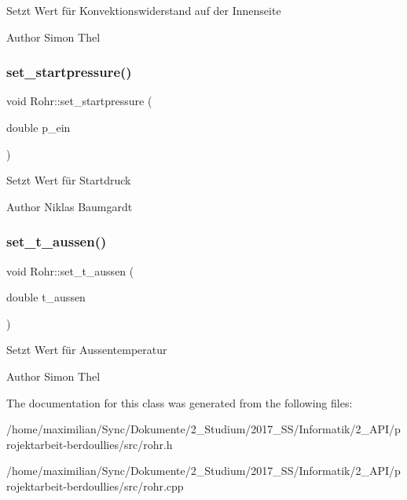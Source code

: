 Setzt Wert für Konvektionswiderstand auf der Innenseite \begin{DoxyAuthor}{Author}
Simon Thel 
\end{DoxyAuthor}
\mbox{\label{class_rohr_ac9d6974bc17fde3cba4b67fb571c7ab7}} 
\subsubsection{\texorpdfstring{set\+\_\+startpressure()}{set\_startpressure()}}
{\footnotesize\ttfamily void Rohr\+::set\+\_\+startpressure (\begin{DoxyParamCaption}\item[{double}]{p\+\_\+ein }\end{DoxyParamCaption})}

Setzt Wert für Startdruck \begin{DoxyAuthor}{Author}
Niklas Baumgardt 
\end{DoxyAuthor}
\mbox{\label{class_rohr_a92be37f04575328b6b15de5ab2e511a9}} 
\subsubsection{\texorpdfstring{set\+\_\+t\+\_\+aussen()}{set\_t\_aussen()}}
{\footnotesize\ttfamily void Rohr\+::set\+\_\+t\+\_\+aussen (\begin{DoxyParamCaption}\item[{double}]{t\+\_\+aussen }\end{DoxyParamCaption})}

Setzt Wert für Aussentemperatur \begin{DoxyAuthor}{Author}
Simon Thel 
\end{DoxyAuthor}


The documentation for this class was generated from the following files\+:\begin{DoxyCompactItemize}
\item 
/home/maximilian/\+Sync/\+Dokumente/2\+\_\+\+Studium/2017\+\_\+\+S\+S/\+Informatik/2\+\_\+\+A\+P\+I/projektarbeit-\/berdoullies/src/rohr.\+h\item 
/home/maximilian/\+Sync/\+Dokumente/2\+\_\+\+Studium/2017\+\_\+\+S\+S/\+Informatik/2\+\_\+\+A\+P\+I/projektarbeit-\/berdoullies/src/rohr.\+cpp\end{DoxyCompactItemize}
